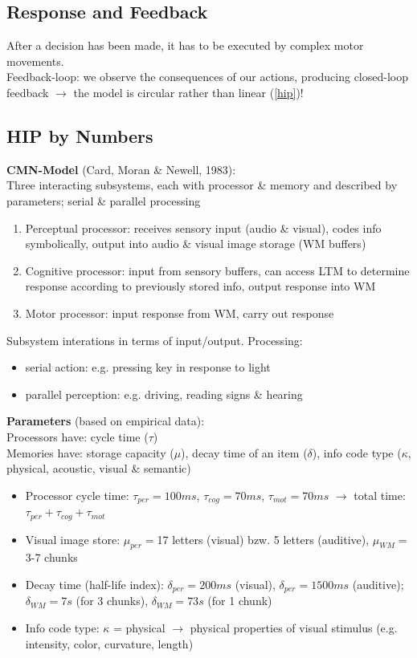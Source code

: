 \subsection{Response and Feedback}
After a decision has been made, it has to be executed by complex motor movements.\\
Feedback-loop: we observe the consequences of our actions, producing closed-loop feedback $\rightarrow$ the model is circular rather than linear (\autoref{hip})!

\subsection{HIP by Numbers}
\textbf{CMN-Model} (Card, Moran \& Newell, 1983):\\
Three interacting subsystems, each with processor \& memory and described by parameters; serial \& parallel processing
\begin{enumerate}
\item Perceptual processor: receives sensory input (audio \& visual), codes info symbolically, output into audio \& visual image storage (WM buffers)
\item Cognitive processor: input from sensory buffers, can access LTM to determine response according to previously stored info, output response into WM
\item Motor processor: input response from WM, carry out response
\end{enumerate}
Subsystem interations in terms of input/output. Processing:
\begin{itemize}
\item serial action: e.g. pressing key in response to light
\item parallel perception: e.g. driving, reading signs \& hearing
\end{itemize}
\textbf{Parameters} (based on empirical data):\\
Processors have: cycle time ($\tau$)\\
Memories have: storage capacity ($\mu$), decay time of an item ($\delta$), info code type ($\kappa$, physical, acoustic, visual \& semantic)
\begin{itemize}
\item Processor cycle time: $\tau_{per} = 100ms$, $\tau_{cog} = 70ms$, $\tau_{mot} = 70ms$ $\rightarrow$ total time: $\tau_{per} + \tau_{cog} + \tau_{mot}$
\item Visual image store:  $\mu_{per} =$17 letters (visual) bzw. 5 letters (auditive), $\mu_{WM} =$3-7 chunks
\item Decay time (half-life index): $\delta_{per}=200ms$ (visual), $\delta_{per}=1500ms$ (auditive); $\delta_{WM}=7s$ (for 3 chunks), $\delta_{WM}=73s$ (for 1 chunk) 
\item Info code type: $\kappa$ = physical $\rightarrow$ physical properties of visual stimulus (e.g. intensity, color, curvature, length)
\end{itemize}
